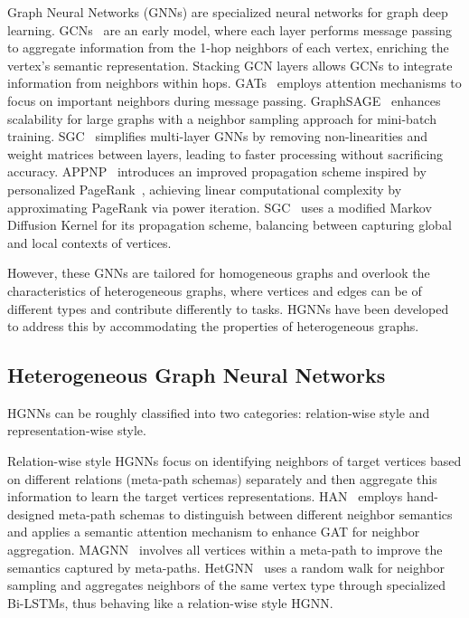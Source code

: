 \documentclass[lettersize,journal]{IEEEtran}
\begin{document}
Graph Neural Networks (GNNs) are specialized neural networks for graph deep learning.
GCNs~\cite{DBLP:conf/iclr/KipfW17} are an early model, where each layer performs message passing to aggregate information from the 1-hop neighbors of each vertex, enriching the vertex's semantic representation. 
Stacking  GCN layers allows GCNs to integrate information from neighbors within  hops.
GATs~\cite{DBLP:conf/iclr/VelickovicCCRLB18} employs attention mechanisms to focus on important neighbors during message passing.
GraphSAGE~\cite{DBLP:conf/nips/HamiltonYL17} enhances scalability for large graphs with a neighbor sampling approach for mini-batch training. 
SGC~\cite{DBLP:conf/icml/WuSZFYW19} simplifies multi-layer GNNs by removing non-linearities and weight matrices between layers, leading to faster processing without sacrificing accuracy.
APPNP~\cite{DBLP:conf/iclr/KlicperaBG19} introduces an improved propagation scheme inspired by personalized PageRank~\cite{Page1999ThePC}, achieving linear computational complexity by approximating PageRank via power iteration. 
SGC~\cite{DBLP:conf/iclr/ZhuK21} uses a modified Markov Diffusion Kernel for its propagation scheme, balancing between capturing global and local contexts of vertices.


However, these GNNs are tailored for homogeneous graphs and overlook the characteristics of heterogeneous graphs, where vertices and edges can be of different types and contribute differently to tasks. 
HGNNs have been developed to address this by accommodating the properties of heterogeneous graphs.








\subsection{Heterogeneous Graph Neural Networks}



HGNNs can be roughly classified into two categories: relation-wise style and representation-wise style.


Relation-wise style HGNNs focus on identifying neighbors of target vertices based on different relations (meta-path schemas) separately and then aggregate this information to learn the target vertices representations. 
HAN~\cite{DBLP:conf/www/WangJSWYCY19} employs hand-designed meta-path schemas to distinguish between different neighbor semantics and applies a semantic attention mechanism to enhance GAT for neighbor aggregation. 
MAGNN~\cite{DBLP:conf/www/0004ZMK20} involves all vertices within a meta-path to improve the semantics captured by meta-paths. 
HetGNN~\cite{DBLP:conf/kdd/ZhangSHSC19} uses a random walk for neighbor sampling and aggregates neighbors of the same vertex type through specialized Bi-LSTMs, thus behaving like a relation-wise style HGNN.
\end{document}
